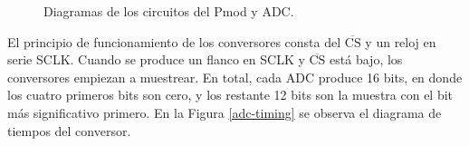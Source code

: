\begin{figure}[hbt!]
    \centering
    \hspace{10mm}
    \caption{Diagramas de los circuitos del Pmod y ADC.}
    \label{diagramas-adc}
\end{figure}

El principio de funcionamiento de los conversores consta del $\overline{\mbox{CS}}$ y un reloj en serie SCLK. Cuando se produce un flanco en SCLK y $\overline{\mbox{CS}}$ está bajo, los conversores empiezan a muestrear. En total, cada ADC produce 16 bits, en donde los cuatro primeros bits son cero, y los restante 12 bits son la muestra con el bit más significativo primero. En la Figura \ref{adc-timing} se observa el diagrama de tiempos del conversor.

